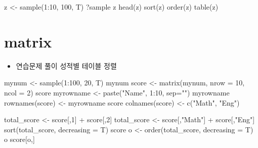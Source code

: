 \documentclass[
]{book}
\newenvironment{Shaded}{\begin{snugshade}}{\end{snugshade}}
\newcommand{\AttributeTok}[1]{\textcolor[rgb]{0.77,0.63,0.00}{#1}}
\newcommand{\DecValTok}[1]{\textcolor[rgb]{0.00,0.00,0.81}{#1}}
\newcommand{\FunctionTok}[1]{\textcolor[rgb]{0.00,0.00,0.00}{#1}}
\newcommand{\NormalTok}[1]{#1}
\newcommand{\OtherTok}[1]{\textcolor[rgb]{0.56,0.35,0.01}{#1}}
\newcommand{\SpecialCharTok}[1]{\textcolor[rgb]{0.00,0.00,0.00}{#1}}
\newcommand{\StringTok}[1]{\textcolor[rgb]{0.31,0.60,0.02}{#1}}
\providecommand{\tightlist}{%
  \setlength{\itemsep}{0pt}\setlength{\parskip}{0pt}}
\begin{document}
\begin{Shaded}
\begin{Highlighting}[]
\NormalTok{z }\OtherTok{\textless{}{-}} \FunctionTok{sample}\NormalTok{(}\DecValTok{1}\SpecialCharTok{:}\DecValTok{10}\NormalTok{, }\DecValTok{100}\NormalTok{, T)}
\NormalTok{?sample}
\NormalTok{z}
\FunctionTok{head}\NormalTok{(z)}
\FunctionTok{sort}\NormalTok{(z)}
\FunctionTok{order}\NormalTok{(z)}
\FunctionTok{table}\NormalTok{(z)}
\end{Highlighting}
\end{Shaded}

\hypertarget{matrix-1}{%
\section{matrix}\label{matrix-1}}

\begin{itemize}
\tightlist
\item
  연습문제 풀이 성적별 테이블 정렬
\end{itemize}

\begin{Shaded}
\begin{Highlighting}[]
\NormalTok{mynum }\OtherTok{\textless{}{-}} \FunctionTok{sample}\NormalTok{(}\DecValTok{1}\SpecialCharTok{:}\DecValTok{100}\NormalTok{, }\DecValTok{20}\NormalTok{, T)}
\NormalTok{mynum}
\NormalTok{score }\OtherTok{\textless{}{-}} \FunctionTok{matrix}\NormalTok{(mynum, }\AttributeTok{nrow =} \DecValTok{10}\NormalTok{, }\AttributeTok{ncol =} \DecValTok{2}\NormalTok{)}
\NormalTok{score}
\NormalTok{myrowname }\OtherTok{\textless{}{-}} \FunctionTok{paste}\NormalTok{(}\StringTok{"Name"}\NormalTok{, }\DecValTok{1}\SpecialCharTok{:}\DecValTok{10}\NormalTok{, }\AttributeTok{sep=}\StringTok{""}\NormalTok{)}
\NormalTok{myrowname}
\FunctionTok{rownames}\NormalTok{(score) }\OtherTok{\textless{}{-}}\NormalTok{ myrowname}
\NormalTok{score}
\FunctionTok{colnames}\NormalTok{(score) }\OtherTok{\textless{}{-}} \FunctionTok{c}\NormalTok{(}\StringTok{"Math"}\NormalTok{, }\StringTok{"Eng"}\NormalTok{)}

\NormalTok{total\_score }\OtherTok{\textless{}{-}}\NormalTok{ score[,}\DecValTok{1}\NormalTok{] }\SpecialCharTok{+}\NormalTok{ score[,}\DecValTok{2}\NormalTok{]}
\NormalTok{total\_score }\OtherTok{\textless{}{-}}\NormalTok{ score[,}\StringTok{"Math"}\NormalTok{] }\SpecialCharTok{+}\NormalTok{ score[,}\StringTok{"Eng"}\NormalTok{]}
\FunctionTok{sort}\NormalTok{(total\_score, }\AttributeTok{decreasing =}\NormalTok{ T)}
\NormalTok{score}
\NormalTok{o }\OtherTok{\textless{}{-}} \FunctionTok{order}\NormalTok{(total\_score, }\AttributeTok{decreasing =}\NormalTok{ T)}
\NormalTok{o}
\NormalTok{score[o,]}
\end{Highlighting}
\end{Shaded}
\end{document}
